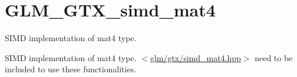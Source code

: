 \hypertarget{group__gtx__simd__mat4}{\section{G\-L\-M\-\_\-\-G\-T\-X\-\_\-simd\-\_\-mat4}
\label{group__gtx__simd__mat4}
}


S\-I\-M\-D implementation of mat4 type.  


S\-I\-M\-D implementation of mat4 type. $<$\hyperlink{simd__mat4_8hpp}{glm/gtx/simd\-\_\-mat4.\-hpp}$>$ need to be included to use these functionalities. 